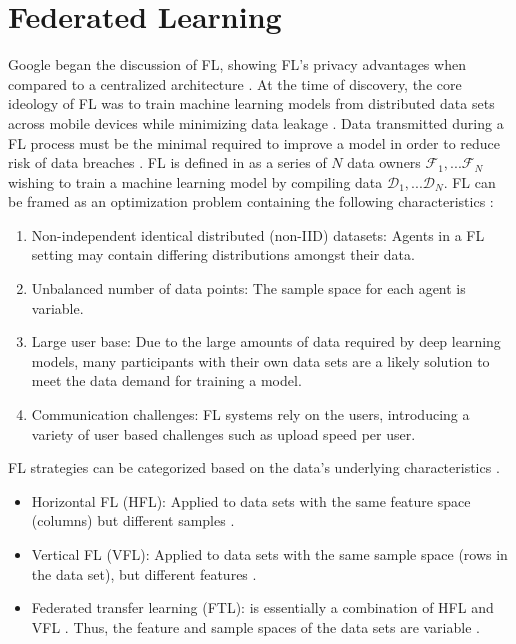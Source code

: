 \section{Federated Learning}
Google began the discussion of FL, showing FL's privacy advantages when compared
to a centralized architecture \cite{Konecny2015, BrendanMcMahan2017a, McMahan2016FederatedLO}.
At the time of discovery, the core ideology of FL was to train machine learning models from
distributed data sets across mobile devices while minimizing data leakage \cite{McMahan2016FederatedLO}.
Data transmitted during a FL process must be the minimal required to improve a model in order to
reduce risk of data breaches \cite{BrendanMcMahan2017a}.  FL is defined in \cite{Yang2019a, IntelAI19}
as a series of $N$ data owners ${\mathcal{F}_1,...\mathcal{F}_N}$ wishing to train a machine learning
model by compiling data ${\mathcal{D}_1,...\mathcal{D}_N}$.  FL can be framed as an optimization
problem containing the following characteristics \cite{IntelAI19}:
\begin{enumerate}
    \item Non-independent identical distributed (non-IID) datasets: Agents in a FL setting
    may contain differing distributions amongst their data.
    \item Unbalanced number of data points: The sample space for each agent is variable.
    \item Large user base: Due to the large amounts of data required by deep learning
    models, many participants with their own data sets are a likely solution to meet
    the data demand for training a model.
    \item Communication challenges: FL systems rely on the users, introducing a variety
    of user based challenges such as upload speed per user.
\end{enumerate}

FL strategies can be categorized based on the data's underlying characteristics
\cite{Yang2019a, IntelAI19}.

\begin{itemize}
    \item Horizontal FL (HFL): Applied to data sets with the same feature space (columns)
    but different samples \cite{Yang2019a, IntelAI19}.
    \item Vertical FL (VFL): Applied to data sets with the same sample space (rows in the
    data set), but different features \cite{Yang2019a}.
    \item Federated transfer learning (FTL): is essentially a combination of HFL and
    VFL \cite{Yang2019a, IntelAI19}.  Thus, the feature and sample spaces of the data
    sets are variable \cite{Yang2019a}.
\end{itemize}

